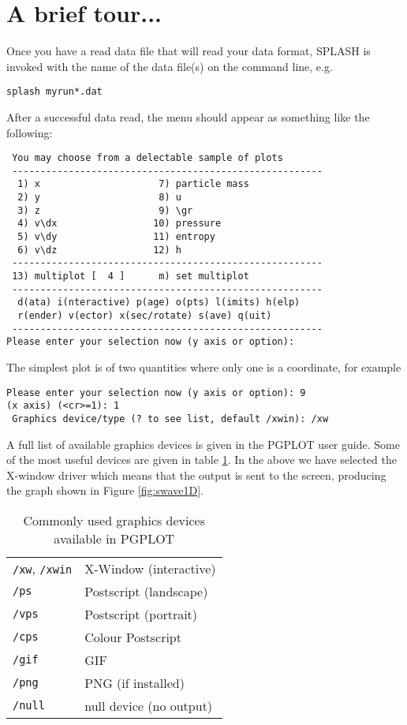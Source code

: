 \documentclass[a4paper,11pt]{article}
\begin{document}
\section{A brief tour...}
 Once you have a read data file that will read your data format,
SPLASH is invoked with the name of the data
file(s) on the command line, e.g.
\begin{verbatim}
splash myrun*.dat
\end{verbatim}

After a successful data read, the menu should appear as something like the
following:
\begin{verbatim}
 You may choose from a delectable sample of plots
 -------------------------------------------------------
  1) x                     7) particle mass
  2) y                     8) u
  3) z                     9) \gr
  4) v\dx                 10) pressure
  5) v\dy                 11) entropy
  6) v\dz                 12) h
 -------------------------------------------------------
 13) multiplot [  4 ]      m) set multiplot
 -------------------------------------------------------
  d(ata) i(nteractive) p(age) o(pts) l(imits) h(elp)
  r(ender) v(ector) x(sec/rotate) s(ave) q(uit)
 -------------------------------------------------------
Please enter your selection now (y axis or option):
\end{verbatim}
The simplest plot is of two quantities where only one is a coordinate, for
example
\begin{verbatim}
Please enter your selection now (y axis or option): 9
(x axis) (<cr>=1): 1
 Graphics device/type (? to see list, default /xwin): /xw
\end{verbatim}
 A full list of available graphics devices is given in the PGPLOT user guide.
Some of the most useful devices are given in table \ref{tab:devices}. In the
above we have selected the X-window driver which means that the output is sent to the
screen, producing the graph shown in Figure \ref{fig:swave1D}.
\begin{table}[h]
\centering
\begin{tabular}{|l|l|}
\hline
\verb+/xw+, \verb+/xwin+ & X-Window (interactive) \\
\verb+/ps+ & Postscript (landscape) \\
\verb+/vps+ & Postscript (portrait) \\
\verb+/cps+ & Colour Postscript \\
\verb+/gif+ & GIF \\
\verb+/png+ & PNG (if installed) \\
\verb+/null+ & null device (no output) \\
\hline
\end{tabular}
\caption{Commonly used graphics devices available in PGPLOT}
\label{tab:devices}
\end{table}
\end{document}
